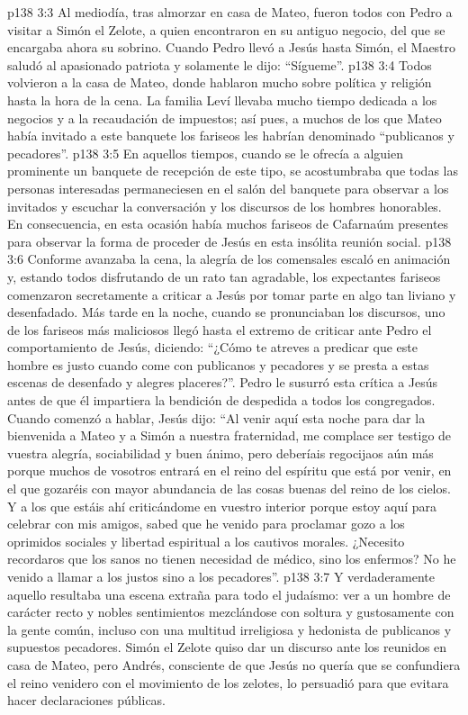 \vs p138 3:3 \pc Al mediodía, tras almorzar en casa de Mateo, fueron todos con Pedro a visitar a Simón el Zelote, a quien encontraron en su antiguo negocio, del que se encargaba ahora su sobrino. Cuando Pedro llevó a Jesús hasta Simón, el Maestro saludó al apasionado patriota y solamente le dijo: “Sígueme”.
\vs p138 3:4 \pc Todos volvieron a la casa de Mateo, donde hablaron mucho sobre política y religión hasta la hora de la cena. La familia Leví llevaba mucho tiempo dedicada a los negocios y a la recaudación de impuestos; así pues, a muchos de los que Mateo había invitado a este banquete los fariseos les habrían denominado “publicanos y pecadores”.
\vs p138 3:5 En aquellos tiempos, cuando se le ofrecía a alguien prominente un banquete de recepción de este tipo, se acostumbraba que todas las personas interesadas permaneciesen en el salón del banquete para observar a los invitados y escuchar la conversación y los discursos de los hombres honorables. En consecuencia, en esta ocasión había muchos fariseos de Cafarnaúm presentes para observar la forma de proceder de Jesús en esta insólita reunión social.
\vs p138 3:6 Conforme avanzaba la cena, la alegría de los comensales escaló en animación y, estando todos disfrutando de un rato tan agradable, los expectantes fariseos comenzaron secretamente a criticar a Jesús por tomar parte en algo tan liviano y desenfadado. Más tarde en la noche, cuando se pronunciaban los discursos, uno de los fariseos más maliciosos llegó hasta el extremo de criticar ante Pedro el comportamiento de Jesús, diciendo: “¿Cómo te atreves a predicar que este hombre es justo cuando come con publicanos y pecadores y se presta a estas escenas de desenfado y alegres placeres?”. Pedro le susurró esta crítica a Jesús antes de que él impartiera la bendición de despedida a todos los congregados. Cuando comenzó a hablar, Jesús dijo: “Al venir aquí esta noche para dar la bienvenida a Mateo y a Simón a nuestra fraternidad, me complace ser testigo de vuestra alegría, sociabilidad y buen ánimo, pero deberíais regocijaos aún más porque muchos de vosotros entrará en el reino del espíritu que está por venir, en el que gozaréis con mayor abundancia de las cosas buenas del reino de los cielos. Y a los que estáis ahí criticándome en vuestro interior porque estoy aquí para celebrar con mis amigos, sabed que he venido para proclamar gozo a los oprimidos sociales y libertad espiritual a los cautivos morales. ¿Necesito recordaros que los sanos no tienen necesidad de médico, sino los enfermos? No he venido a llamar a los justos sino a los pecadores”.
\vs p138 3:7 Y verdaderamente aquello resultaba una escena extraña para todo el judaísmo: ver a un hombre de carácter recto y nobles sentimientos mezclándose con soltura y gustosamente con la gente común, incluso con una multitud irreligiosa y hedonista de publicanos y supuestos pecadores. Simón el Zelote quiso dar un discurso ante los reunidos en casa de Mateo, pero Andrés, consciente de que Jesús no quería que se confundiera el reino venidero con el movimiento de los zelotes, lo persuadió para que evitara hacer declaraciones públicas.
